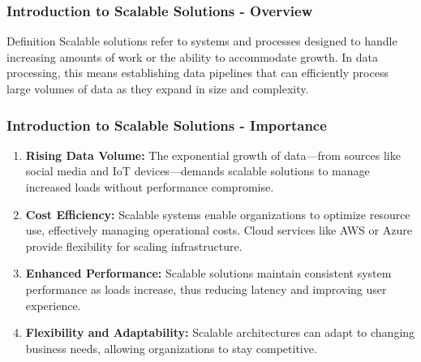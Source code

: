 \documentclass[aspectratio=169]{beamer}
\begin{document}
\frame{\titlepage}

\begin{frame}[fragile]
    \frametitle{Introduction to Scalable Solutions - Overview}
    \begin{block}{Definition}
        Scalable solutions refer to systems and processes designed to handle increasing amounts of work or the ability to accommodate growth. In data processing, this means establishing data pipelines that can efficiently process large volumes of data as they expand in size and complexity.
    \end{block}
\end{frame}

\begin{frame}[fragile]
    \frametitle{Introduction to Scalable Solutions - Importance}
    \begin{enumerate}
        \item \textbf{Rising Data Volume:}  
        The exponential growth of data—from sources like social media and IoT devices—demands scalable solutions to manage increased loads without performance compromise.
        
        \item \textbf{Cost Efficiency:}  
        Scalable systems enable organizations to optimize resource use, effectively managing operational costs. Cloud services like AWS or Azure provide flexibility for scaling infrastructure.

        \item \textbf{Enhanced Performance:}  
        Scalable solutions maintain consistent system performance as loads increase, thus reducing latency and improving user experience.

        \item \textbf{Flexibility and Adaptability:}  
        Scalable architectures can adapt to changing business needs, allowing organizations to stay competitive.
    \end{enumerate}
\end{frame}
\end{document}
